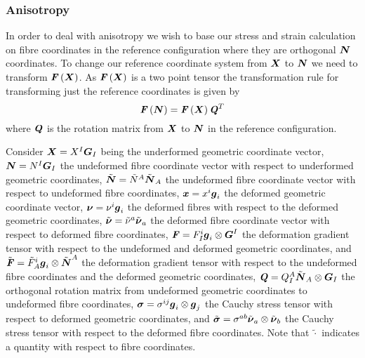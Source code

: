 


\subsubsection{Anisotropy}

In order to deal with anisotropy we wish to base our stress and strain
calculation on fibre coordinates in the reference configuration where they are
orthogonal \ie $\boldsymbol{N}$ coordinates. To change our reference coordinate
system from $\boldsymbol{X}$ to $\boldsymbol{N}$ we need to transform
$ \boldsymbol{\mathit{F}}\left( \boldsymbol{X} \right) $. As $ \boldsymbol{\mathit{F}}\left( \boldsymbol{X} \right) $ is a two
point tensor the transformation rule for transforming just the reference
coordinates is given by
\begin{equation}
   \boldsymbol{\mathit{F}}\left( \boldsymbol{N} \right) = \boldsymbol{\mathit{F}}\left( \boldsymbol{X} \right) {\boldsymbol{\mathit{Q}}}^{T}
\end{equation}
where $\boldsymbol{\mathit{Q}}$ is the rotation matrix from $\boldsymbol{X}$ to $\boldsymbol{N}$ in
the reference configuration.

Consider $\boldsymbol{X}=X^{I}\boldsymbol{G}_{I}$ being the underformed geometric
coordinate vector, $\boldsymbol{N}=N^{I}\boldsymbol{G}_{I}$ the undeformed fibre
coordinate vector with respect to underformed geometric coordinates,
$\tilde{\boldsymbol{N}}=\tilde{N}^{A}\tilde{\boldsymbol{N}}_{A}$ the undeformed fibre
coordinate vector with respect to undeformed fibre coordinates,
$\boldsymbol{x}=x^{i}\boldsymbol{g}_{i}$ the deformed geometric coordinate vector,
$\boldsymbol{\nu}=\nu^{i}\boldsymbol{g}_{i}$ the deformed fibres with respect to the
deformed geometric coordinates,
$\tilde{\boldsymbol{\nu}}=\tilde{\nu}^{a}\tilde{\boldsymbol{\nu}}_{a}$ the deformed
fibre coordinate vector with respect to deformed fibre coordinates,
$\boldsymbol{\mathit{F}}=F^{i}_{I} \boldsymbol{g}_{i} \otimes \boldsymbol{G}^{I} $ the
deformation gradient tensor with respect to the undeformed and deformed
geometric coordinates, and
$\tilde{\boldsymbol{\mathit{F}}}=\tilde{F}^{i}_{A} \boldsymbol{g}_{i} \otimes \tilde{\boldsymbol{N}}^{A} $
the deformation gradient tensor with respect to the undeformed fibre
coordinates and the deformed geometric coordinates,
$\boldsymbol{\mathit{Q}}=Q^{A}_{I} \tilde{\boldsymbol{N}}_{A} \otimes \boldsymbol{G}_{I} $ the
orthogonal rotation matrix from undeformed geometric coordinates to undeformed
fibre coordinates,
$\boldsymbol{\mathit{\sigma}}=\sigma^{ij} \boldsymbol{g}_{i} \otimes \boldsymbol{g}_{j} $ the
Cauchy stress tensor with respect to deformed geometric coordinates, and
$\tilde{\boldsymbol{\mathit{\sigma}}}=\sigma^{ab} \tilde{\boldsymbol{\nu}}_{a} \otimes \tilde{\boldsymbol{\nu}}_{b} $
the Cauchy stress tensor with respect to the deformed fibre coordinates. Note
that $\tilde{\cdot}$ indicates a quantity with respect to fibre coordinates.


